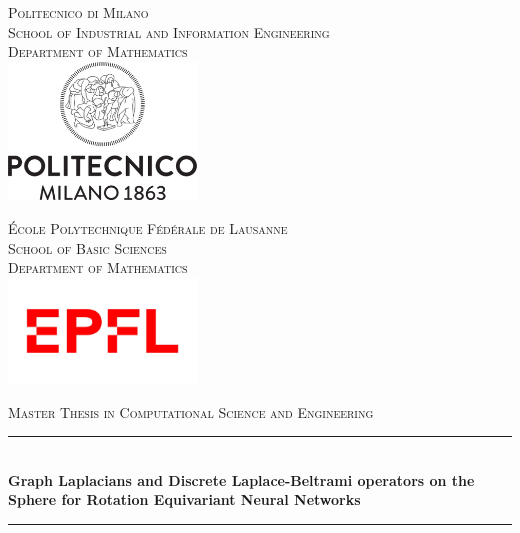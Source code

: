 
\begin{titlepage}
\newcommand{\HRule}{\rule{\linewidth}{1mm}} %
\begin{minipage}[t]{.49\textwidth}
	\raggedleft
	\center
	\textsc{\footnotesize Politecnico di Milano}\\
	\textsc{ \scriptsize School of Industrial and Information Engineering}\\
	\textsc{\scriptsize Department of Mathematics}\\[0.5cm]
	\includegraphics[width=5cm]{figs/cover/polimi.png}
\end{minipage}
\hfill
%
\begin{minipage}[t]{.49\textwidth}
	\raggedright
	\center
	\textsc{\footnotesize \'Ecole Polytechnique F\'ed\'erale de Lausanne}\\
	\textsc{\scriptsize School of Basic Sciences}\\
	\textsc{\scriptsize Department of Mathematics}\\[0.8cm]
	\includegraphics[width=5cm]{figs/cover/EPFL.jpg}
\end{minipage}
\center %
\vspace{1cm}

\textsc{\large Master Thesis in Computational Science and Engineering}\\[1cm]

\HRule \\[0.4cm]
{ \LARGE \bfseries Graph Laplacians and Discrete Laplace-Beltrami operators on the Sphere for Rotation Equivariant Neural Networks}\\[0.4cm] 
\HRule \\[1.5cm]     
\vfill 


\end{titlepage}
